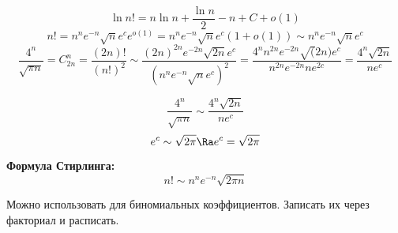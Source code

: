 \begin{exmp}
\begin{enumerate}
$$\ln n! = n \ln n + \frac{\ln n}{2} - n + C + o(1)$$
$$n! = n^n e^{-n}\sqrt{n}e^ce^{o(1)} = n^{n}e^{-n}\sqrt{n}e^c(1 + o(1)) \sim 
n^n e^{-n}\sqrt{n}e^c$$
$$\frac{4^n}{\sqrt{\pi n}} = C_{2n}^n = \frac{(2n)!}{(n!)^2} \sim 
\frac{(2n)^{2n}e^{-2n}\sqrt{2n}e^c}{(n^ne^{-n}\sqrt{n}e^c)^2} = 
\frac{4^n n^{2n}e^{-2n}\sqrt(2n)e^c}{n^{2n}e^{-2n}ne^{2c}} = \frac{4^n\sqrt{2n}}{ne^c}$$

$$\frac{4^n}{\sqrt{\pi n}} \sim \frac{4^n \sqrt{2n}}{n e^c}$$
$$e^c \sim \sqrt{2\pi} \Ra e^c = \sqrt{2\pi} $$

\textbf{Формула Стирлинга:}
$$n! \sim n^ne^{-n}\sqrt{2\pi n} $$

\begin{Rem}
    Можно использовать для биномиальных коэффициентов. Записать их через
    факториал и расписать.
\end{Rem}



\end{enumerate}                                                                           

\end{exmp}
